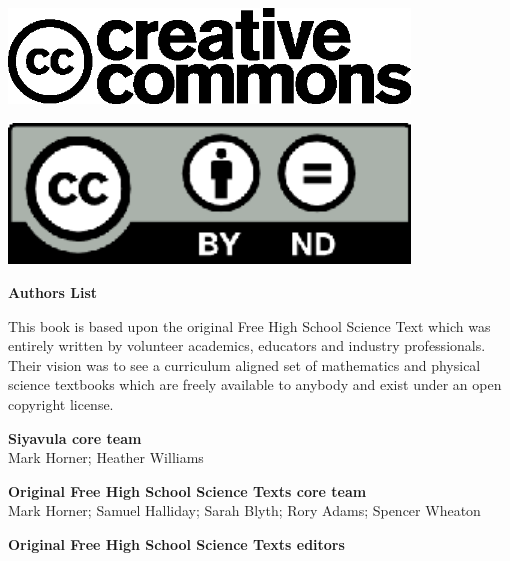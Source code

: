 \begin{center}
\begin{minipage}{0.6\textwidth}
\includegraphics[width=0.8\textwidth]{title_images/cc2.eps}
\end{minipage}
\begin{minipage}{0.3\textwidth}
\includegraphics[width=0.8\textwidth]{title_images/cc1.eps}
\end{minipage}
\end{center}







\newpage
\thispagestyle{empty}


\begin{flushleft} \textbf{\huge Authors List} \end{flushleft}

{\LARGE This book is based upon the original Free High School Science Text which was entirely written by
volunteer academics, educators and industry professionals. Their vision was to see a curriculum aligned
set of mathematics and physical science textbooks which are freely available to anybody and exist
under an open copyright license.} \par

\textbf{\LARGE Siyavula core team} \\

Mark Horner; Heather Williams \par

\textbf{\LARGE Original Free High School Science Texts core team}\\

Mark Horner; Samuel Halliday; Sarah Blyth; Rory Adams; Spencer Wheaton \par 


\textbf{\LARGE Original Free High School Science Texts editors}\\

